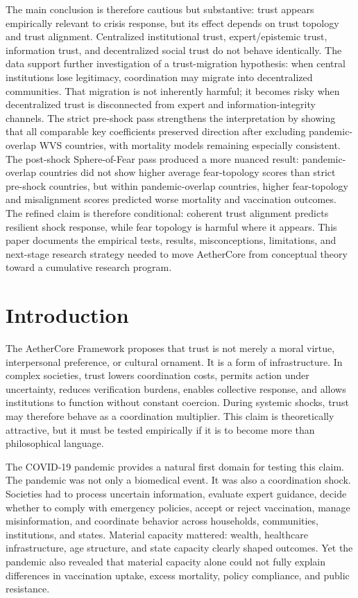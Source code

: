 \documentclass[12pt]{article}
\begin{document}
The main conclusion is therefore cautious but substantive: trust appears empirically relevant to crisis response, but its effect depends on trust topology and trust alignment. Centralized institutional trust, expert/epistemic trust, information trust, and decentralized social trust do not behave identically. The data support further investigation of a trust-migration hypothesis: when central institutions lose legitimacy, coordination may migrate into decentralized communities. That migration is not inherently harmful; it becomes risky when decentralized trust is disconnected from expert and information-integrity channels. The strict pre-shock pass strengthens the interpretation by showing that all comparable key coefficients preserved direction after excluding pandemic-overlap WVS countries, with mortality models remaining especially consistent. The post-shock Sphere-of-Fear pass produced a more nuanced result: pandemic-overlap countries did not show higher average fear-topology scores than strict pre-shock countries, but within pandemic-overlap countries, higher fear-topology and misalignment scores predicted worse mortality and vaccination outcomes. The refined claim is therefore conditional: coherent trust alignment predicts resilient shock response, while fear topology is harmful where it appears. This paper documents the empirical tests, results, misconceptions, limitations, and next-stage research strategy needed to move AetherCore from conceptual theory toward a cumulative research program.

\section{Introduction}

The AetherCore Framework proposes that trust is not merely a moral virtue, interpersonal preference, or cultural ornament. It is a form of infrastructure. In complex societies, trust lowers coordination costs, permits action under uncertainty, reduces verification burdens, enables collective response, and allows institutions to function without constant coercion. During systemic shocks, trust may therefore behave as a coordination multiplier. This claim is theoretically attractive, but it must be tested empirically if it is to become more than philosophical language.

The COVID-19 pandemic provides a natural first domain for testing this claim. The pandemic was not only a biomedical event. It was also a coordination shock. Societies had to process uncertain information, evaluate expert guidance, decide whether to comply with emergency policies, accept or reject vaccination, manage misinformation, and coordinate behavior across households, communities, institutions, and states. Material capacity mattered: wealth, healthcare infrastructure, age structure, and state capacity clearly shaped outcomes. Yet the pandemic also revealed that material capacity alone could not fully explain differences in vaccination uptake, excess mortality, policy compliance, and public resistance.
\end{document}
